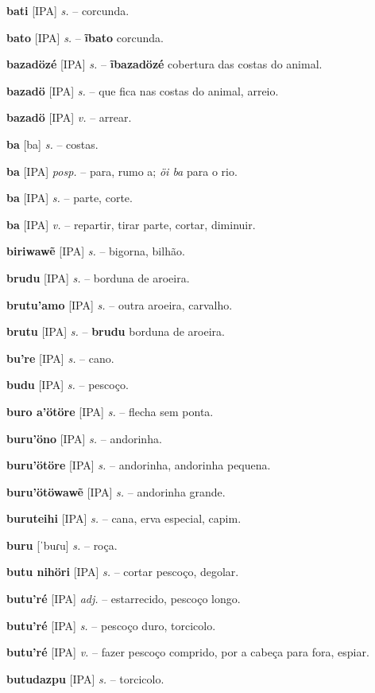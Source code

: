 \textbf{bati} [IPA] \textit{s.} -- corcunda.

\textbf{bato} [IPA] \textit{s.} -- \textbf{ĩbato} corcunda.

\textbf{bazadözé} [IPA] \textit{s.} -- \textbf{ĩbazadözé} cobertura das costas do animal.

\textbf{bazadö} [IPA] \textit{s.} -- que fica nas costas do animal, arreio.

\textbf{bazadö} [IPA] \textit{v.} -- arrear.

\textbf{ba} [ba] \textit{s.} -- costas.

\textbf{ba} [IPA] \textit{posp.} -- para, rumo a;  \textit{öi ba} para o rio.

\textbf{ba} [IPA] \textit{s.} -- parte, corte.

\textbf{ba} [IPA] \textit{v.} -- repartir, tirar parte, cortar, diminuir.

\textbf{biriwawẽ} [IPA] \textit{s.} -- bigorna, bilhão.

\textbf{brudu} [IPA] \textit{s.} -- borduna de aroeira.

\textbf{brutu'amo} [IPA] \textit{s.} -- outra aroeira, carvalho.

\textbf{brutu} [IPA] \textit{s.} -- \textbf{brudu} borduna de aroeira.

\textbf{bu're} [IPA] \textit{s.} -- cano.

\textbf{budu} [IPA] \textit{s.} -- pescoço.

\textbf{buro a'ötöre} [IPA] \textit{s.} -- flecha sem ponta.

\textbf{buru'öno} [IPA] \textit{s.} -- andorinha.

\textbf{buru'ötöre} [IPA] \textit{s.} -- andorinha, andorinha pequena.

\textbf{buru'ötöwawẽ} [IPA] \textit{s.} -- andorinha grande.

\textbf{buruteihi} [IPA] \textit{s.} -- cana, erva especial, capim.

\textbf{buru} [ˈbuɾu] \textit{s.} -- roça.

\textbf{butu nihöri} [IPA] \textit{s.} -- cortar pescoço, degolar.

\textbf{butu'ré} [IPA] \textit{adj.} -- estarrecido, pescoço longo.

\textbf{butu'ré} [IPA] \textit{s.} -- pescoço duro, torcicolo.

\textbf{butu'ré} [IPA] \textit{v.} -- fazer pescoço comprido, por a cabeça para fora, espiar.

\textbf{butudazpu} [IPA] \textit{s.} -- torcicolo.

